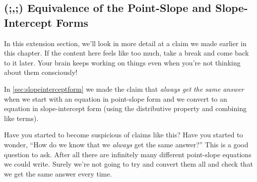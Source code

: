 %
%
%
 
\subsection{(;,;) Equivalence of the Point-Slope and Slope-Intercept Forms}

In this extension section, we'll look in more detail at a claim we made earlier in this chapter. If the content here feels like too much, take a break and come back to it later. Your brain keeps working on things even when you're not thinking about them consciously!

In \cref{sec:slopeinterceptform} we made the claim that \textit{always get the same answer} when we start with an equation in point-slope form and we convert to an equation in slope-intercept form (using the distributive property and combining like terms).

Have you started to become suspicious of claims like this? Have you started to wonder, ``How do we know that we \textit{always} get the same answer?'' This is a good question to ask. After all there are infinitely many different point-slope equations we could write. Surely we're not going to try and convert them all and check that we get the same answer every time.

